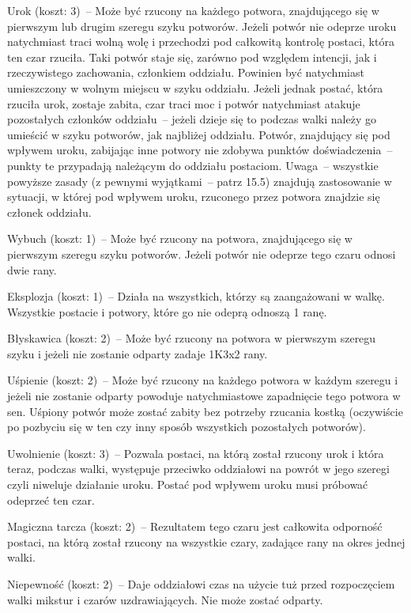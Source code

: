 Urok (koszt: 3)~-- Może być rzucony na każdego potwora, znajdującego się w pierwszym lub drugim szeregu szyku potworów.
Jeżeli potwór nie odeprze uroku natychmiast traci wolną wolę i przechodzi pod całkowitą kontrolę postaci, która ten czar rzuciła.
Taki potwór staje się, zarówno pod względem intencji, jak i rzeczywistego zachowania, członkiem oddziału.
Powinien być natychmiast umieszczony w wolnym miejscu w szyku oddziału.
Jeżeli jednak postać, która rzuciła urok, zostaje zabita, czar traci moc i potwór natychmiast atakuje pozostałych członków oddziału~-- jeżeli dzieje się to podczas walki należy go umieścić w szyku potworów, jak najbliżej oddziału.
Potwór, znajdujący się pod wpływem uroku, zabijając inne potwory nie zdobywa punktów doświadczenia~-- punkty te przypadają należącym do oddziału postaciom.
Uwaga~-- wszystkie powyższe zasady (z pewnymi wyjątkami~-- patrz 15.5) znajdują zastosowanie w sytuacji, w której pod wpływem uroku, rzuconego przez potwora znajdzie się członek oddziału.

Wybuch (koszt: 1)~-- Może być rzucony na potwora, znajdującego się w pierwszym szeregu szyku potworów.
Jeżeli potwór nie odeprze tego czaru odnosi dwie rany.

Eksplozja (koszt: 1)~-- Działa na wszystkich, którzy są zaangażowani w walkę.
Wszystkie postacie i potwory, które go nie odeprą odnoszą 1 ranę.

Błyskawica (koszt: 2)~-- Może być rzucony na potwora w pierwszym szeregu szyku i jeżeli nie zostanie odparty zadaje 1K3x2 rany.

Uśpienie (koszt: 2)~-- Może być rzucony na każdego potwora w każdym szeregu i jeżeli nie zostanie odparty powoduje natychmiastowe zapadnięcie tego potwora w sen.
Uśpiony potwór może zostać zabity bez potrzeby rzucania kostką (oczywiście po pozbyciu się w ten czy inny sposób wszystkich pozostałych potworów).

Uwolnienie (koszt: 3)~-- Pozwala postaci, na którą został rzucony urok i która teraz, podczas walki, występuje przeciwko oddziałowi na powrót w jego szeregi czyli niweluje działanie uroku.
Postać pod wpływem uroku musi próbować odeprzeć ten czar.

Magiczna tarcza (koszt: 2)~-- Rezultatem tego czaru jest całkowita odporność postaci, na którą został rzucony na wszystkie czary, zadające rany na okres jednej walki.

Niepewność (koszt: 2)~-- Daje oddziałowi czas na użycie tuż przed rozpoczęciem walki mikstur i czarów uzdrawiających.
Nie może zostać odparty.


